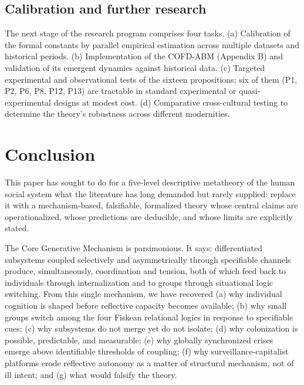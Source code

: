 \documentclass[12pt,a4paper]{article}
\begin{document}
\subsection{Calibration and further research}

The next stage of the research program comprises four tasks. (a) Calibration of the formal constants by parallel empirical estimation across multiple datasets and historical periods. (b) Implementation of the COFD-ABM (Appendix B) and validation of its emergent dynamics against historical data. (c) Targeted experimental and observational tests of the sixteen propositions; six of them (P1, P2, P6, P8, P12, P13) are tractable in standard experimental or quasi-experimental designs at modest cost. (d) Comparative cross-cultural testing to determine the theory's robustness across different modernities.



\section{Conclusion}

This paper has sought to do for a five-level descriptive metatheory of the human social system what the literature has long demanded but rarely supplied: replace it with a mechanism-based, falsifiable, formalized theory whose central claims are operationalized, whose predictions are deducible, and whose limits are explicitly stated.


The Core Generative Mechanism is parsimonious. It says: differentiated subsystems coupled selectively and asymmetrically through specifiable channels produce, simultaneously, coordination and tension, both of which feed back to individuals through internalization and to groups through situational logic switching. From this single mechanism, we have recovered (a) why individual cognition is shaped before reflective capacity becomes available; (b) why small groups switch among the four Fiskean relational logics in response to specifiable cues; (c) why subsystems do not merge yet do not isolate; (d) why colonization is possible, predictable, and measurable; (e) why globally synchronized crises emerge above identifiable thresholds of coupling; (f) why surveillance-capitalist platforms erode reflective autonomy as a matter of structural mechanism, not of ill intent; and (g) what would falsify the theory.
\end{document}
